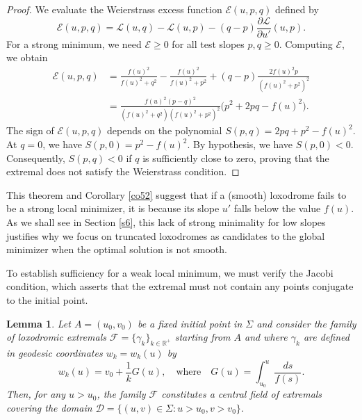\documentclass[a4paper,12pt]{amsart}
\newtheorem{lemma}[theorem]{Lemma}
\theoremstyle{definition}
\begin{document}
\begin{proof}
We evaluate  the Weierstrass excess function $\mathcal{E}(u, p, q)$ defined by 
\begin{equation*}
\mathcal{E}(u, p, q) = \mathcal{L}(u, q) - \mathcal{L}(u, p) - (q - p)\frac{\partial \mathcal{L}}{\partial u'}(u, p).
\end{equation*}
For a strong minimum, we need  $\mathcal{E}\geq 0$ for all test slopes $p,q\geq 0$.  Computing $\mathcal{E}$, we obtain
\begin{equation*}
\begin{split}
\mathcal{E}(u, p, q) &= \frac{f(u)^2}{f(u)^2 + q^2} - \frac{f(u)^2}{f(u)^2 + p^2} + (q - p)\frac{2f(u)^2 p}{(f(u)^2 + p^2)^2}\\
&= \frac{f(u)^2 (p - q)^2}{(f(u)^2 + q^2)(f(u)^2 + p^2)^2} \Big( p^2 + 2pq - f(u)^2 \Big).
\end{split}
\end{equation*}
The sign of $\mathcal{E}(u, p, q)$ depends on the polynomial $S(p,q) = 2pq + p^2 - f(u)^2$. At $q = 0$, we have $S(p,0) = p^2 - f(u)^2$. By hypothesis, we have  $S(p,0)<0$. Consequently, $S(p,q)<0$ if $q$ is sufficiently close to zero, proving that  the extremal does not satisfy the Weierstrass condition.
\end{proof} 
 
 This theorem and Corollary \ref{co52} suggest that if a (smooth) loxodrome  fails to be a strong local minimizer, it is because its slope $u'$ falls below the value $f(u)$.    As we shall see in Section \ref{s6}, this lack of strong minimality for low  slopes   justifies why we focus on truncated loxodromes as candidates to the global minimizer when the optimal solution is not smooth.  
 

To establish sufficiency for a weak local minimum, we must verify the Jacobi condition, which asserts that the extremal must not contain any points conjugate to the initial point.  

\begin{lemma} 
Let $A= (u_0, v_0)$ be a fixed initial point in $\Sigma$ and consider the family of loxodromic extremals $\mathcal{F} = \{ \gamma_k \}_{k \in \mathbb{R}^+}$ starting from $A$ and where $\gamma_k$ are defined in geodesic coordinates $w_k=w_k(u)$ by 
\begin{equation} \label{field_eq}
w_k(u) = v_0 + \frac{1}{k} G(u), \quad \text{where} \quad G(u) = \int_{u_0}^{u} \frac{ds}{f(s)}.
\end{equation}
Then, for any $u > u_0$, the family $\mathcal{F}$ constitutes a central field of extremals covering the domain $\mathcal{D} = \{ (u, v) \in \Sigma : u > u_0, v > v_0 \}$.
\end{lemma}
\end{document}
